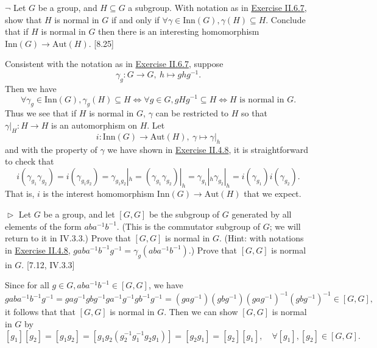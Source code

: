\documentclass[12pt,letterpaper,boxed]{hmcpset}
\newcommand{\Aut}{\mathrm{Aut}}
\newcommand{\Inn}{\mathrm{Inn}}
\begin{document}
\begin{problem}[7.10]
$\neg$ Let $G$ be a group, and $H\subseteq G$ a subgroup. With notation as in \hyperlink{Exercise II.6.7}{Exercise II.6.7}, show that $H$ is normal in $G$ if and only if $\forall \gamma \in \Inn(G), \gamma(H) \subseteq H$.
Conclude that if $H$ is normal in $G$ then there is an interesting homomorphism
$\Inn(G)\to \Aut(H)$. [8.25]
\end{problem}
\begin{solution}
Consistent with the notation as in \hyperlink{Exercise II.6.7}{Exercise II.6.7}, suppose
\[
\gamma_g:G\longrightarrow G,\ h\longmapsto ghg^{-1}.
\]
Then we have
\[
\forall \gamma_g \in \Inn(G), \gamma_g(H) \subseteq H\iff \forall g\in G, gHg^{-1}\subseteq H\iff \text{$H$ is normal in $G$}.
\]
Thus we see that if $H$ is normal in $G$, $\gamma$ can be restricted to $H$ so that $\gamma|_H:H\rightarrow H$ is an automorphism on $H$. Let 
\[
i:\Inn(G)\longrightarrow \Aut(H),\ \gamma\longmapsto\gamma|_h
\]
and with the property of $\gamma$ we have shown in \hyperlink{Exercise II.4.8}{Exercise II.4.8}, it is straightforward to check that
\[
i(\gamma_{g_1}\gamma_{g_2})=i(\gamma_{g_1g_2})=\gamma_{g_1g_2}|_h=(\gamma_{g_1}\gamma_{g_2})|_h=\gamma_{g_1}|_h\gamma_{g_2}|_h=i(\gamma_{g_1})i(\gamma_{g_2}).
\]
That is, $i$ is the interest homomorphism $\Inn(G)\to \Aut(H)$ that we expect.
\end{solution}

\hypertarget{Exercise II.7.11}{}
\begin{problem}[7.11]
$\vartriangleright$ Let $G$ be a group, and let $[G,G]$ be the subgroup of $G$ generated by all elements of the form $aba^{-1}b^{-1}$. (This is the commutator subgroup of $G$; we will return to it in \textsection IV.3.3.) Prove that $[G,G]$ is normal in $G$. (Hint: with notations in \hyperlink{Exercise II.4.8}{Exercise II.4.8}, $gaba^{-1}b^{-1}g^{-1} = \gamma_g(aba^{-1}b^{-1})$.) Prove that $[G,G]$ is normal in $G$. [7.12, \textsection IV.3.3]
\end{problem}
\begin{solution}
Since for all $g\in G, aba^{-1}b^{-1}\in[G,G]$, we have
\[
gaba^{-1}b^{-1}g^{-1}=gag^{-1}gbg^{-1}ga^{-1}g^{-1}gb^{-1}g^{-1}=(gag^{-1})(gbg^{-1})(gag^{-1})^{-1}(gbg^{-1})^{-1}\in[G,G],
\]
it follows that that $[G,G]$ is normal in $G$. Then we can show $[G,G]$ is normal in $G$ by
\[
[g_1][g_2]=[g_1g_2]=[g_1g_2(g_2^{-1}g_1^{-1}g_2g_1)]=[g_2g_1]=[g_2][g_1],\quad\forall [g_1],[g_2]\in[G,G].
\]
\end{solution}
\end{document}
